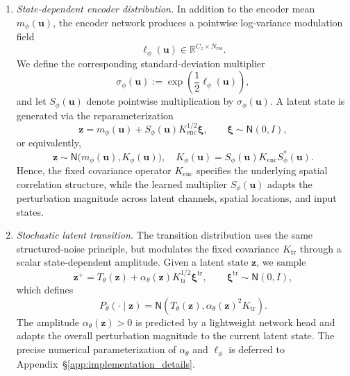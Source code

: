 \documentclass[11pt]{article}
\begin{document}
\begin{enumerate}[topsep=2pt]
\item\textit{State-dependent encoder distribution.} In addition to the encoder mean $m_\phi(\mathbf u)$, the encoder network produces a pointwise log-variance modulation field
\[
    \ell_\phi(\mathbf u)
    \in
    \mathbb R^{C_z\times N_{\mathrm{res}}}.
\]
We define the corresponding standard-deviation multiplier
\[
    \sigma_\phi(\mathbf u)
    :=
    \exp\!\left(\frac12\ell_\phi(\mathbf u)\right),
\]
and let $S_\phi(\mathbf u)$ denote pointwise multiplication by
$\sigma_\phi(\mathbf u)$. A latent state is generated via the reparameterization
\begin{equation}
    \mathbf z
    =
    m_\phi(\mathbf u)
    +
    S_\phi(\mathbf u)
    K_{\mathrm{enc}}^{1/2}\boldsymbol\xi,\qquad
    \boldsymbol\xi\sim\mathsf N(0,I),
    \label{eq:discrete_encoder_reparam}
\end{equation}
or equivalently,
\[
    \mathbf z
    \sim
    \mathsf N\bigl(
        m_\phi(\mathbf u),
        K_\phi(\mathbf u)
    \bigr),\quad K_\phi(\mathbf u)=S_\phi(\mathbf u)K_{\mathrm{enc}}S_\phi^*(\mathbf u).
\]
Hence, the fixed covariance operator $K_{\mathrm{enc}}$ specifies the underlying spatial correlation structure, while the learned multiplier $S_\phi(\mathbf u)$ adapts the perturbation magnitude across latent channels, spatial locations, and input states.

\item\textit{Stochastic latent transition.} The transition distribution uses the same structured-noise principle, but modulates the fixed covariance $K_{\mathrm{tr}}$ through a scalar state-dependent amplitude. Given a latent state $\mathbf z$, we sample
\begin{equation}
    \mathbf z^+
    =
    T_\theta(\mathbf z)
    +
    \alpha_\theta(\mathbf z)
    K_{\mathrm{tr}}^{1/2}\boldsymbol\xi^{\mathrm{tr}},
    \qquad
    \boldsymbol\xi^{\mathrm{tr}}
    \sim
    \mathsf N(0,I),
    \label{eq:discrete_transition_reparam}
\end{equation}
which defines
\begin{equation}
    P_\theta(\cdot\mid\mathbf z)
    =
    \mathsf N\!\left(
        T_\theta(\mathbf z),
        \alpha_\theta(\mathbf z)^2K_{\mathrm{tr}}
    \right).
    \label{eq:discrete_transition_kernel}
\end{equation}
The amplitude $\alpha_\theta(\mathbf z)>0$ is predicted by a lightweight network head and adapts the overall perturbation magnitude to the current latent state. The precise numerical parameterization of $\alpha_\theta$ and $\ell_\phi$ is deferred to Appendix~\S\ref{app:implementation_details}.
\end{enumerate}
\end{document}
